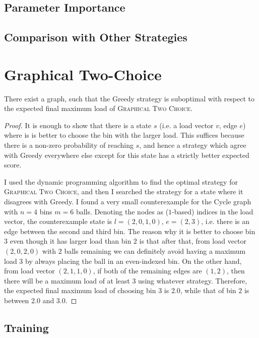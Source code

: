 \subsection{Parameter Importance}


\subsection{Comparison with Other Strategies}


\section{Graphical Two-Choice}


\begin{lemma} \label{lemma: greedy-suboptimal}
There exist a graph, such that the Greedy strategy is suboptimal with respect to the expected final maximum load of \textsc{Graphical Two Choice}.
\end{lemma}

\begin{proof}
It is enough to show that there is a state $s$ (i.e. a load vector $v$, edge $e$) where is is better to choose the bin with the larger load. This suffices because there is a non-zero probability of reaching $s$, and hence a strategy which agree with Greedy everywhere else except for this state has a strictly better expected score.


I used the dynamic programming algorithm to find the optimal strategy for \textsc{Graphical Two Choice}, and then I searched the strategy for a state where it disagrees with Greedy. I found a very small counterexample for the Cycle graph with $n=4$ bins $m=6$ balls. Denoting the nodes as ($1$-based) indices in the load vector, the counterexample state is $l=(2,0,1,0)$, $e=(2,3)$, i.e. there is an edge between the second and third bin. The reason why it is better to choose bin $3$ even though it has larger load than bin $2$ is that after that, from load vector $(2,0,2,0)$ with $2$ balls remaining we can definitely avoid having a maximum load $3$ by always placing the ball in an even-indexed bin. On the other hand, from load vector $(2,1,1,0)$, if both of the remaining edges are $(1,2)$, then there will be a maximum load of at least $3$ using whatever strategy. Therefore, the expected final maximum load of choosing bin $3$ is $2.0$, while that of bin $2$ is between $2.0$ and $3.0$.
\end{proof}

\subsection{Training}


